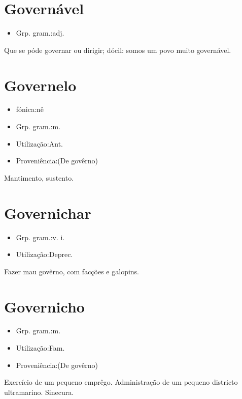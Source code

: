 \section{Governável}
\begin{itemize}
\item {Grp. gram.:adj.}
\end{itemize}
Que se póde governar ou dirigir; dócil: \textunderscore somos um povo muito governável\textunderscore .
\section{Governelo}
\begin{itemize}
\item {fónica:nê}
\end{itemize}
\begin{itemize}
\item {Grp. gram.:m.}
\end{itemize}
\begin{itemize}
\item {Utilização:Ant.}
\end{itemize}
\begin{itemize}
\item {Proveniência:(De \textunderscore govêrno\textunderscore )}
\end{itemize}
Mantimento, sustento.
\section{Governichar}
\begin{itemize}
\item {Grp. gram.:v. i.}
\end{itemize}
\begin{itemize}
\item {Utilização:Deprec.}
\end{itemize}
Fazer mau govêrno, com facções e galopins.
\section{Governicho}
\begin{itemize}
\item {Grp. gram.:m.}
\end{itemize}
\begin{itemize}
\item {Utilização:Fam.}
\end{itemize}
\begin{itemize}
\item {Proveniência:(De \textunderscore govêrno\textunderscore )}
\end{itemize}
Exercício de um pequeno emprêgo.
Administração de um pequeno districto ultramarino.
Sinecura.
